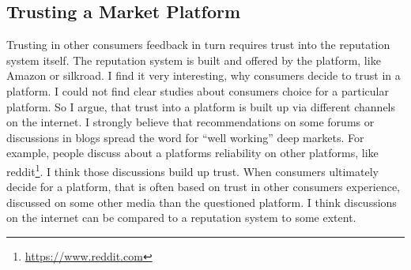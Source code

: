 \subsection{Trusting a Market Platform}

Trusting in other consumers feedback in turn requires trust into the reputation system itself. The reputation system is built and offered by the platform, like Amazon or silkroad. I find it very interesting, why consumers decide to trust in a platform. I could not find clear studies about consumers choice for a particular platform. So I argue, that trust into a platform is built up via different channels on the internet. I strongly believe that recommendations on some forums or discussions in blogs spread the word for ``well working'' deep markets. For example, people discuss about a platforms reliability on other platforms, like reddit\footnote{\url{https://www.reddit.com}}. I think those discussions build up trust. When consumers ultimately decide for a platform, that is often based on trust in other consumers experience, discussed on some other media than the questioned platform. I think discussions on the internet can be compared to a reputation system to some extent.